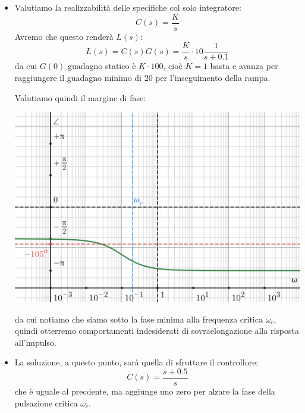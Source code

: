 \documentclass[a4paper,11pt]{article}
\begin{document}
\begin{itemize}
	\item 
		Valutiamo la realizzabilità delle specifiche col solo integratore:
		$$
		C(s) = \frac{K}{s}
		$$
		Avremo che questo renderà $L(s)$:
		$$
		L(s) = C(s) G(s) = \frac{K}{s} \cdot 10 \frac{1}{s + 0.1}
		$$
		da cui $G(0)$ guadagno statico è $K \cdot 100$, cioè $K = 1$ basta e avanza per raggiungere il guadagno minimo di $20$ per l'inseguimento della rampa.

		Valutiamo quindi il margine di fase:
		\begin{center}
			\includegraphics[scale=0.28]{../figures/crociera_phi_bad.png}
		\end{center}
		da cui notiamo che siamo sotto la fase minima alla frequenza critica $\omega_c$, quindi otterremo comportamenti indesiderati di sovraelongazione alla risposta all'impulso.

	\item
		La soluzione, a questo punto, sarà quella di sfruttare il controllore:
		$$
		C(s) = \frac{s + 0.5}{s}
		$$
		che è uguale al precdente, ma aggiunge uno zero per alzare la fase della pulsazione critica $\omega_c$.

		\noindent
		\begin{minipage}{\textwidth}
			

\end{minipage}
\end{itemize}
\end{document}
